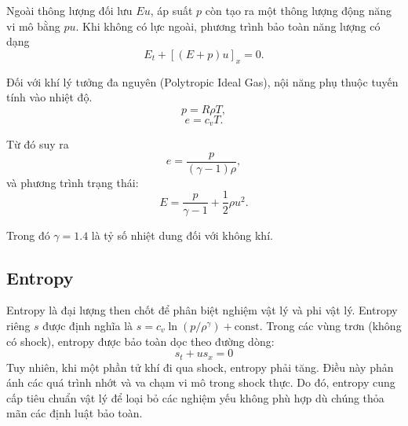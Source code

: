 Ngoài thông lượng đối lưu $Eu$, áp suất $p$ còn tạo ra một thông lượng động năng vi mô bằng $pu$. Khi không có lực ngoài, phương trình bảo toàn năng lượng có dạng
\begin{equation*}
E_t + [(E+p)u]_x = 0.
\tag{14.7}
\end{equation*}

Đối với khí lý tưởng đa nguyên (Polytropic Ideal Gas), nội năng phụ thuộc tuyến tính vào nhiệt độ.
\begin{equation*}
p = R\rho T,
\tag{14.9}
\end{equation*}
\begin{equation*}
e = c_v T.
\tag{14.10}
\end{equation*}

Từ đó suy ra
\begin{equation*}
e = \frac{p}{(\gamma - 1)\rho},
\tag{14.22}
\end{equation*}
và phương trình trạng thái:
\begin{equation*}
E = \frac{p}{\gamma - 1} + \frac12 \rho u^2.
\tag{14.23}
\end{equation*}

Trong đó $\gamma = 1.4$ là tỷ số nhiệt dung đối với không khí.

\subsection{Entropy}
Entropy là đại lượng then chốt để phân biệt nghiệm vật lý và phi vật lý. Entropy riêng $s$ được định nghĩa là $s = c_v \ln(p/\rho^\gamma) + \text{const}$. Trong các vùng trơn (không có shock), entropy được bảo toàn dọc theo đường dòng:
\begin{equation*}
    s_t + u s_x = 0
\end{equation*}
Tuy nhiên, khi một phần tử khí đi qua shock, entropy phải tăng. Điều này phản ánh các quá trình nhớt và va chạm vi mô trong shock thực. Do đó, entropy cung cấp tiêu chuẩn vật lý để loại bỏ các nghiệm yếu không phù hợp dù chúng thỏa mãn các định luật bảo toàn.



